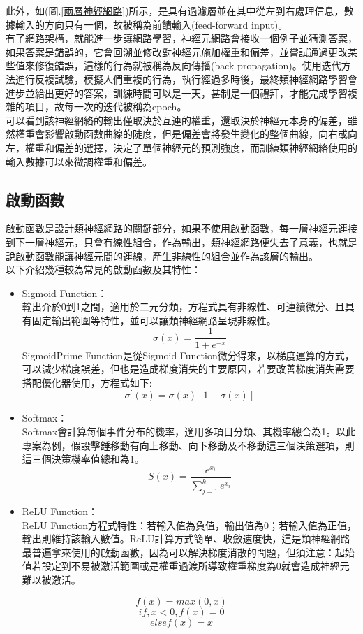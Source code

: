 \documentclass[14pt,a4paper]{report}  %
\begin{document}
 此外，如(圖.\ref{兩層神經網路})所示，是具有過濾層並在​​其中從左到右處理信息，數據輸入的方向只有一個，故被稱為前饋輸入(feed-forward input)。\\

 有了網路架構，就能進一步讓網路學習，神經元網路會接收一個例子並猜測答案，如果答案是錯誤的，它會回溯並修改對神經元施加權重和偏差，並嘗試通過更改某些值來修復錯誤，這樣的行為就被稱為反向傳播(back propagation)。使用迭代方法進行反複試驗，模擬人們重複的行為，執行經過多時後，最終類神經網路學習會進步並給出更好的答案，訓練時間可以是一天，甚制是一個禮拜，才能完成學習複雜的項目，故每一次的迭代被稱為epoch。\\

 可以看到該神經網絡的輸出僅取決於互連的權重，還取決於神經元本身的偏差，雖然權重會影響啟動函數曲線的陡度，但是偏差會將發生變化的整個曲線，向右或向左，權重和偏差的選擇，決定了單個神經元的預測強度，而訓練類神經網絡使用的輸入數據可以來微調權重和偏差。\\
\subsection{啟動函數}
啟動函數是設計類神經網路的關鍵部分，如果不使用啟動函數，每一層神經元連接到下一層神經元，只會有線性組合，作為輸出，類神經網路便失去了意義，也就是說啟動函數能讓神經元間的連線，產生非線性的組合並作為該層的輸出。\\
以下介紹幾種較為常見的啟動函數及其特性：
\begin{itemize}
\item Sigmoid Function：\\
輸出介於0到1之間，適用於二元分類，方程式具有非線性、可連續微分、且具有固定輸出範圍等特性，並可以讓類神經網路呈現非線性。\\
$$\sigma(x)=\frac{1}{1+e^{-x}}$$
SigmoidPrime Function是從Sigmoid Function微分得來，以梯度運算的方式，可以減少梯度誤差，但也是造成梯度消失的主要原因，若要改善梯度消失需要搭配優化器使用，方程式如下:\\
$$\sigma^{'}(x)=\sigma(x)[1-\sigma(x)]$$
\item Softmax：\\
Softmax會計算每個事件分布的機率，適用多項目分類、其機率總合為1。以此專案為例，假設擊錘移動有向上移動、向下移動及不移動這三個決策選項，則這三個決策機率值總和為1。\\
$$S(x)=\frac{e^{x_i}}{\sum^k_{j=1}e^{x_i}}$$
\item ReLU Function：\\
ReLU Function方程式特性：若輸入值為負值，輸出值為0；若輸入值為正值，輸出則維持該輸入數值。ReLU計算方式簡單、收斂速度快，這是類神經網路最普遍拿來使用的啟動函數，因為可以解決梯度消散的問題，但須注意：起始值若設定到不易被激活範圍或是權重過渡所導致權重梯度為0就會造成神經元難以被激活。\\
\end{itemize}
$$f(x)=max(0,x)$$
$$if , x<0 , f(x)=0$$
$$else f(x)=x$$
\end{document}
